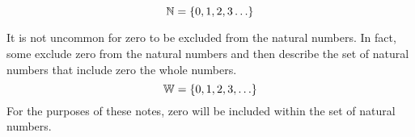 \begin{definition}

\[
\mathbb{N}=\left\{0, 1, 2, 3 \ldots\right\}
\]

\end{definition}

\begin{remark}
It is not uncommon for zero to be excluded from the natural numbers.  In fact, some exclude zero from the natural numbers and then describe the set of natural numbers that include zero the whole numbers. 
\begin{equation*}
\mathbb{W}=\left\{0, 1, 2, 3, \ldots\right\}
\end{equation*}
For the purposes of these notes, zero will be included within the set of natural numbers.
\end{remark}